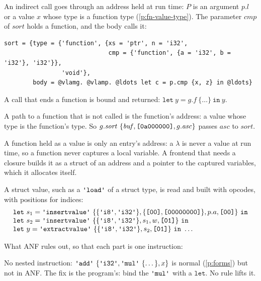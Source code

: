 \documentclass[11pt,letterpaper]{article}
\newcommand{\kw}[1]{\mathtt{#1}}
\newcommand{\str}[1]{\text{\ttfamily\textquotesingle #1\textquotesingle}}  %
\newcommand{\hex}[1]{\text{\ttfamily [#1]}}  %
\newcounter{pt}
\newcommand{\pref}[1]{\ref{#1}}  %
\begin{document}
\begin{points}
\begin{subpoints}
  \item\label{p:indirect}An indirect call goes through an address held at run time: $P$ is an argument $p.l$ or a value $x$
    whose type is a function type (\pref{p:fn-value-type}). The parameter $\mathit{cmp}$ of $\mathit{sort}$ holds a
    function, and the body calls it:
\begin{Verbatim}[commandchars=\@\<\>, xleftmargin=2em]
sort = {type = {'function', {xs = 'ptr', n = 'i32',
                             cmp = {'function', {a = 'i32', b = 'i32'}, 'i32'}},
                'void'},
        body = @vlamg. @vlamp. @ldots let c = p.cmp {x, z} in @ldots}
\end{Verbatim}
  \item A call that ends a function is bound and returned: $\kw{let}\ y = g.f\ \{\dots\}\ \kw{in}\ y$.
  \item A path to a function that is not called is the function's address: a value whose type is the function's
    type. So $g.\mathit{sort}\ \{\mathit{buf}, \hex{0a000000}, g.\mathit{asc}\}$ passes $\mathit{asc}$ to $\mathit{sort}$.
  \item A function held as a value is only an entry's address: a $\lambda$ is never a value at run time, so a
    function never captures a local variable. A frontend that needs a closure builds it as a struct of an address
    and a pointer to the captured variables, which it allocates itself.
  \end{subpoints}
\item\label{p:struct-values} A struct value, such as a $\str{load}$ of a struct type, is read and built
  with opcodes, with positions for indices:
  \[\begin{array}{l}\kw{let}\ s_1 = \str{insertvalue}\ \{\{\str{i8}, \str{i32}\}, \{\hex{00}, \hex{00000000}\}, p.a, \hex{00}\}\ \kw{in} \\
    \kw{let}\ s_2 = \str{insertvalue}\ \{\{\str{i8}, \str{i32}\}, s_1, w, \hex{01}\}\ \kw{in} \\
    \kw{let}\ y = \str{extractvalue}\ \{\{\str{i8}, \str{i32}\}, s_2, \hex{01}\}\ \kw{in}\ \dots\end{array}\]
\item\label{p:anf-rules} What ANF rules out, so that each part is one instruction:
  \begin{subpoints}
  \item No nested instruction: $\str{add}\ \{\str{i32}, \str{mul}\ \{\dots\}, x\}$ is normal (\pref{p:forms}) but not in
    ANF. The fix is the program's: bind the $\str{mul}$ with a $\kw{let}$. No rule lifts it.

\end{subpoints}
\end{points}
\end{document}
